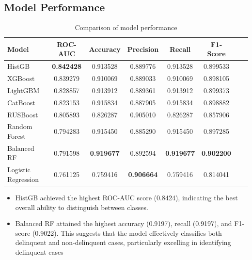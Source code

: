 \documentclass[12pt,letterpaper]{article}
\begin{document}
\subsection{Model Performance}
\begin{table}[H]
    \centering
    \begin{tabular}{|l|c|c|c|c|c|c|c|}
        \hline
        Model & ROC-AUC & Accuracy & Precision & Recall & F1-Score \\
        \hline

        HistGB & \textbf{0.842428} & 0.913528 & 0.889776 & 0.913528 & 0.899533 \\
        XGBoost & 0.839279 & 0.910069 & 0.889033 & 0.910069 & 0.898105 \\
        LightGBM & 0.828857 & 0.913912 & 0.889361 & 0.913912 & 0.899373 \\
        CatBoost & 0.823153 & 0.915834 & 0.887905 & 0.915834 & 0.898882 \\
        RUSBoost & 0.805893 & 0.826287 & 0.905010 & 0.826287 & 0.857906 \\
        Random Forest & 0.794283 & 0.915450 & 0.885290 & 0.915450 & 0.897285 \\
        Balanced RF & 0.791598 & \textbf{0.919677} & 0.892594 & \textbf{0.919677} & \textbf{0.902200} \\
        Logistic Regression & 0.761125 & 0.759416 & \textbf{0.906664} & 0.759416 & 0.814041 \\
        \hline
    \end{tabular}
    \caption{Comparison of model performance}
\end{table}

\begin{itemize}
    \item HistGB achieved the highest ROC-AUC score (0.8424), indicating the best overall ability to distinguish between classes.
    \item Balanced RF attained the highest accuracy (0.9197), recall (0.9197), and F1-score (0.9022). This suggests that the model effectively classifies both delinquent and non-delinquent cases, particularly excelling in identifying delinquent cases
\end{itemize}
\end{document}
